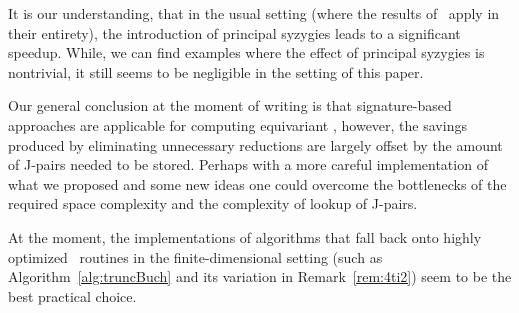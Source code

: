 \begin{example}
It is our understanding, that in the usual setting (where the results of~\cite{Gao-Volny-Wang:signature-GBs} apply in their entirety), the introduction of principal syzygies leads to a significant speedup. While, we can find examples where the effect of principal syzygies is nontrivial, it still seems to be negligible in the setting of this paper.
\end{example}

Our general conclusion at the moment of writing is that signature-based approaches are applicable for computing equivariant \GBs, however, the savings produced by eliminating unnecessary reductions are largely offset by the amount of J-pairs needed to be stored.
Perhaps with a more careful implementation of what we proposed and some new ideas one could overcome the bottlenecks of the required space complexity and the complexity of lookup of J-pairs. 

At the moment, the implementations of algorithms that fall back onto highly optimized \GBs\ routines in the finite-dimensional setting (such as Algorithm~\ref{alg:truncBuch} and its variation in Remark~\ref{rem:4ti2}) seem to be the best practical choice. 